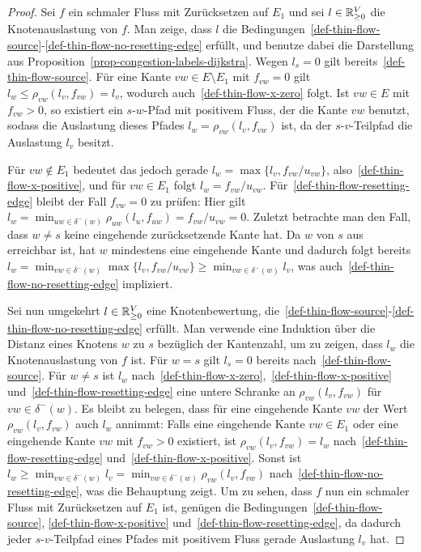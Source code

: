 \begin{proof}
	Sei $f$ ein schmaler Fluss mit Zurücksetzen auf $E_1$ und sei $l\in\mathbb{R}_{\geq 0}^V$ die Knotenauslastung von $f$.
	Man zeige, dass $l$ die Bedingungen~\ref{def-thin-flow-source}-\ref{def-thin-flow-no-resetting-edge} erfüllt, und benutze dabei die Darstellung aus Proposition~\ref{prop-congestion-labels-dijkstra}.
	Wegen $l_s = 0$ gilt bereits~\ref{def-thin-flow-source}.
	Für eine Kante $vw\in E\setminus E_1$ mit $f_{vw}=0$ gilt $l_w\leq \rho_{vw}(l_v, f_{vw}) = l_v$, wodurch auch~\ref{def-thin-flow-x-zero} folgt.
	Ist $vw\in E$ mit $f_{vw} > 0$, so existiert ein $s$-$w$-Pfad mit positivem Fluss, der die Kante $vw$ benutzt, sodass die Auslastung dieses Pfades $l_w=\rho_{vw}(l_v, f_{vw})$ ist, da der $s$-$v$-Teilpfad die Auslastung $l_v$ besitzt.
	
	Für $vw\notin E_1$ bedeutet das jedoch gerade $l_w = \max\{ l_v, f_{vw}/u_{vw} \}$, also~\ref{def-thin-flow-x-positive}, und für $vw\in E_1$ folgt $l_w = f_{vw} / u_{vw}$.
	Für~\ref{def-thin-flow-resetting-edge} bleibt der Fall $f_{vw} = 0$ zu prüfen:
	Hier gilt $l_w = \min_{uw\in\delta^-(w)} \rho_{uw}(l_u, f_{uw}) = f_{vw} / u_{vw} = 0$.
	Zuletzt betrachte man den Fall, dass $w\neq s$ keine eingehende zurücksetzende Kante hat.
	Da $w$ von $s$ aus erreichbar ist, hat $w$ mindestens eine eingehende Kante und dadurch folgt bereits $l_w = \min_{vw\in \delta^-(w)} \max\{ l_v, f_{vw} / u_{vw} \} \geq \min_{vw\in\delta^-(w)} l_v$, was auch~\ref{def-thin-flow-no-resetting-edge} impliziert.
	
	Sei nun umgekehrt $l\in\mathbb{R}_{\geq 0}^V$ eine Knotenbewertung, die~\ref{def-thin-flow-source}-\ref{def-thin-flow-no-resetting-edge} erfüllt.
	Man verwende eine Induktion über die Distanz eines Knotens $w$ zu $s$ bezüglich der Kantenzahl, um zu zeigen, dass $l_w$ die Knotenauslastung von $f$ ist.
	Für $w=s$ gilt $l_s=0$ bereits nach~\ref{def-thin-flow-source}.
	Für $w\neq s$ ist $l_w$ nach~\ref{def-thin-flow-x-zero},~\ref{def-thin-flow-x-positive} und~\ref{def-thin-flow-resetting-edge} eine untere Schranke an $\rho_{vw}(l_v, f_{vw})$ für $vw\in\delta^-(w)$.
	Es bleibt zu belegen, dass für eine eingehende Kante $vw$ der Wert $\rho_{vw}(l_v, f_{vw})$ auch $l_w$ annimmt:
	Falls eine eingehende Kante $vw\in E_1$ oder eine eingehende Kante $vw$ mit $f_{vw} > 0$ existiert, ist $\rho_{vw}(l_v, f_{vw}) = l_w$ nach~\ref{def-thin-flow-resetting-edge} und~\ref{def-thin-flow-x-positive}.
	Sonst ist $l_w\geq \min_{vw\in \delta^-(w)} l_v = \min_{vw\in \delta^-(w)} \rho_{vw}(l_v, f_{vw})$ nach~\ref{def-thin-flow-no-resetting-edge}, was die Behauptung zeigt.
	Um zu sehen, dass $f$ nun ein schmaler Fluss mit Zurücksetzen auf $E_1$ ist, genügen die Bedingungen~\ref{def-thin-flow-source}, \ref{def-thin-flow-x-positive} und~\ref{def-thin-flow-resetting-edge}, da dadurch jeder $s$-$v$-Teilpfad eines Pfades mit positivem Fluss gerade Auslastung $l_v$ hat.
\end{proof}

